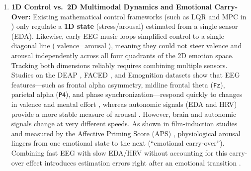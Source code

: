 \documentclass[preprint,12pt]{elsarticle}
\begin{document}
\begin{enumerate}
    \item \textbf{1D Control vs.\ 2D Multimodal Dynamics and Emotional Carry-Over:} Existing mathematical control frameworks (such as LQR and MPC in \cite{azgomi2022enhancement}) only regulate a \textbf{1D state} (stress/arousal) estimated from a single sensor (EDA). Likewise, early EEG music loops \cite{ehrlich2019closed} simplified control to a single diagonal line ($\text{valence} = \text{arousal}$), meaning they could not steer valence and arousal independently across all four quadrants of the 2D emotion space. Tracking both dimensions reliably requires combining multiple sensors. Studies on the DEAP \cite{koelstra2012deap}, FACED \cite{chen2023large}, and Emognition \cite{saganowski2022emognition} datasets show that EEG features---such as frontal alpha asymmetry, midline frontal theta (\texttt{Fz}), parietal alpha (\texttt{P4}), and phase synchronization---respond quickly to changes in valence and mental effort \cite{ewing2016evaluation,marin2018affective}, whereas autonomic signals (EDA and HRV) provide a more stable measure of arousal \cite{koelstra2012deap,khazaei2024bayesian}. However, brain and autonomic signals change at very different speeds. As shown in film-induction studies \cite{fernandez2019effective} and measured by the Affective Priming Score (APS) \cite{gutierrez2025affective}, physiological arousal lingers from one emotional state to the next (``emotional carry-over''). Combining fast EEG with slow EDA/HRV without accounting for this carry-over effect introduces estimation errors right after an emotional transition \cite{wu2023affective,gutierrez2025affective}.


\end{enumerate}
\end{document}

